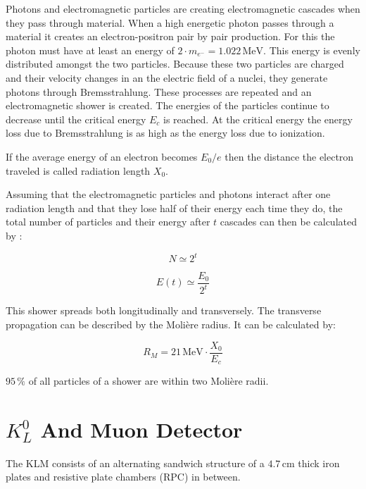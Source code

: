 \documentclass[a4paper,11pt,twosided,final,german,openbib,pdftex,listof=totoc,bibliography=totoc]{scrbook}
\begin{document}
Photons and electromagnetic particles are creating electromagnetic cascades when they pass through material.\cite{leo2012techniques} When a high energetic photon passes through a material it creates an electron-positron pair by pair production. For this the photon must have at least an energy of $2\cdot m_{e^{-}} = 1.022\,\textrm{MeV}$. This energy is evenly distributed amongst the two particles. Because these two particles are charged and their velocity changes in an the electric field of a nuclei, they generate photons through Bremsstrahlung. These processes are repeated and an electromagnetic shower is created. The energies of the particles continue to decrease until the critical energy $E_c$ is reached. At the critical energy the energy loss due to Bremsstrahlung is as high as the energy loss due to ionization.

If the average energy of an electron becomes ${E_0}/{e}$ then the distance the electron traveled is called radiation length $X_0$.

Assuming that the electromagnetic particles and photons interact after one radiation length and that they lose half of their energy each time they do, the total number of particles and their energy after $t$ cascades can then be calculated by \cite{leo2012techniques}:

\begin{equation}
	N \simeq 2^t
\end{equation}

\begin{equation}
	E(t) \simeq \frac{E_0}{2^t}
\end{equation}

This shower spreads both longitudinally and transversely. The transverse propagation can be described by the Moli\`ere radius. It can be calculated by:

\begin{equation}
	R_M=21\,\textrm{MeV}\cdot \frac{X_0}{E_c}
\end{equation}

$ 95\,\%$ of all particles of a shower are within two Moli\`ere radii.\cite{leo2012techniques}

\section{$K_L^0$ And Muon Detector }
\label{sec:KM}

The KLM consists of an alternating sandwich structure of a $4.7\,\textrm{cm}$ thick iron plates and resistive plate chambers (RPC) in between.
\end{document}
